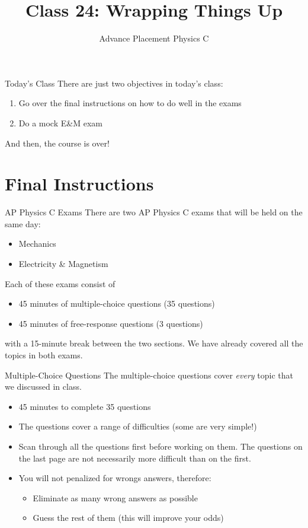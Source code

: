 \documentclass[12pt,aspectratio=169]{beamer}
\title{Class 24: Wrapping Things Up}
\subtitle{Advance Placement Physics C}
\begin{document}
\begin{frame}
  \maketitle
\end{frame}


\begin{frame}{Today's Class}
  There are just two objectives in today's class:
  \begin{enumerate}
  \item Go over the final instructions on how to do well in the exams
  \item Do a mock E\&M exam
  \end{enumerate}
  And then, the course is over!
\end{frame}


\section{Final Instructions}

\begin{frame}{AP Physics C Exams}
  There are two AP Physics C exams that will be held on the same day:
  \begin{itemize}
  \item Mechanics
  \item Electricity \& Magnetism
  \end{itemize}
  Each of these exams consist of 
  \begin{itemize}
  \item 45 minutes of multiple-choice questions (35 questions)
  \item 45 minutes of free-response questions (3 questions)
  \end{itemize}
  with a 15-minute break between the two sections. We have already covered all the topics in
  both exams.
\end{frame}



\begin{frame}{Multiple-Choice Questions}
The multiple-choice questions cover \emph{every} topic that we discussed in class.
\begin{itemize}
  \item 45 minutes to complete 35 questions
  \item The questions cover a range of difficulties (some are very simple!)
  \item Scan through all the questions first before working on them. The questions
    on the last page are not necessarily more difficult than on the first.
  \item You will not penalized for wrongs answers, therefore:
  	\begin{itemize}
  	\item Eliminate as many wrong answers as possible
  	\item Guess the rest of them (this will improve your odds)
  	\end{itemize}
\end{itemize}
\end{frame}
\end{document}
